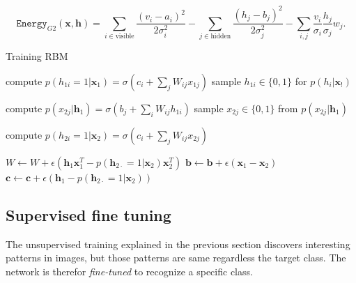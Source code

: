 \begin{equation}
	\mathtt{Energy}_{G2}(\mathbf{x}, \mathbf{h}) = \sum_{i \in \text{visible}}\frac{(v_i - a_i)^2}{2\sigma_i^2} - \sum_{j \in \text{hidden}} \frac{(h_j - b_j)^2}{2\sigma_j^2} - \sum_{i,j}\frac{v_i}{\sigma_i}\frac{h_j}{\sigma_j}w_j.
\end{equation}




\begin{algorithm}
	\caption{Training RBM}
	\label{alg:RBM}
	\begin{algorithmic}[1]
		\Repeat
				\State compute $p(h_{1i}=1|\mathbf{x}_1) = \sigma \left ( c_i + \sum_jW_{ij}x_{1j}  \right )$
				\State sample $h_{1i} \in \{ 0,1 \}$ for $p(h_i|\mathbf{x}_!)$
			\EndFor
			
				\State compute $p(x_{2j}|\mathbf{h}_1) = \sigma \left ( b_j + \sum_iW_{ij}h_{1i} \right )$
				\State sample $x_{2j} \in \{ 0,1 \}$ from $p(x_{2j}|\mathbf{h}_1)$
			\EndFor
			
				\State compute $p(h_{2i}=1|\mathbf{x}_2) = \sigma \left ( c_i + \sum_jW_{ij}x_{2j}  \right )$
			\EndFor
			
			\State $W \gets W + \epsilon \left ( \mathbf{h}_1 \mathbf{x}_1^T - p(\mathbf{h}_{2\cdot} = 1|\mathbf{x}_2)\mathbf{x}_2^T\right )$
			\State $\mathbf{b} \gets \mathbf{b} + \epsilon ( \mathbf{x}_1 - \mathbf{x}_2  )$
			\State $\mathbf{c} \gets \mathbf{c} + \epsilon (\mathbf{h}_1 -  p(\mathbf{h}_{2\cdot} = 1|\mathbf{x}_2))$
		\EndFunction
	\end{algorithmic}
\end{algorithm}


\subsection{Supervised fine tuning}

The unsupervised training explained in the previous section discovers interesting patterns in images, but those patterns are same regardless the target class. The network is therefor \textit{fine-tuned} to recognize a specific class. \\

